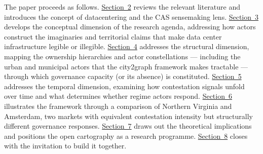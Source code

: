 The paper proceeds as follows. \hyperref[sec:background]{Section~2} reviews the relevant literature and introduces the concept of datacentering and the CAS sensemaking lens. \hyperref[sec:conceptual]{Section~3} develops the conceptual dimension of the research agenda, addressing how actors construct the imaginaries and territorial claims that make data center infrastructure legible or illegible. \hyperref[sec:structural]{Section~4} addresses the structural dimension, mapping the ownership hierarchies and actor constellations — including the urban and municipal actors that the city2graph framework \citep{city2graph} makes tractable — through which governance capacity (or its absence) is constituted. \hyperref[sec:temporal]{Section~5} addresses the temporal dimension, examining how contestation signals unfold over time and what determines whether regime actors respond. \hyperref[sec:case]{Section~6} illustrates the framework through a comparison of Northern Virginia and Amsterdam, two markets with equivalent contestation intensity but structurally different governance responses. \hyperref[sec:discussion]{Section~7} draws out the theoretical implications and positions the open cartography as a research programme. \hyperref[sec:conclusion]{Section~8} closes with the invitation to build it together.
